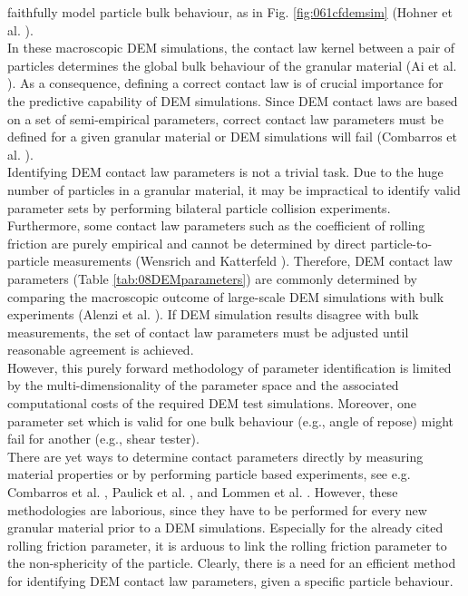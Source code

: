 faithfully model particle bulk behaviour, as in Fig. \ref{fig:061cfdemsim}
(Hohner et al. \cite{RefWorks:86}).\\
 
In these macroscopic \acs{DEM} simulations, the contact law kernel between a 
pair of particles determines the global bulk behaviour of the granular material (Ai et al. \cite{RefWorks:131}). 
As a consequence, defining a correct contact law is of crucial importance for the predictive 
capability of \acs{DEM} simulations. 
Since \acs{DEM} contact laws are based 
on a set of semi-empirical parameters, correct contact law 
parameters must be defined for a given granular material
or \acs{DEM} simulations will fail (Combarros et al. \cite{RefWorks:177}). \\
Identifying \acs{DEM} contact law parameters is not a trivial task. 
Due to the huge number of particles in a granular material, it
may be impractical to identify valid parameter sets by performing bilateral 
particle collision experiments. 
Furthermore, some contact law parameters such as the coefficient of rolling
friction are purely empirical and cannot be determined by direct 
particle-to-particle measurements (Wensrich and Katterfeld \cite{RefWorks:87}).
Therefore, \acs{DEM} contact law parameters (Table \ref{tab:08DEMparameters}) are
commonly determined by comparing the macroscopic outcome of large-scale \acs{DEM}
simulations with bulk experiments (Alenzi et al. \cite{RefWorks:91}). 
If \acs{DEM} simulation results disagree with bulk measurements, the set of contact
law parameters must be adjusted until reasonable agreement is achieved.\\
However, this purely forward methodology of parameter identification is limited by 
the multi-dimensionality of the parameter space and the associated computational costs of the required 
\acs{DEM} test simulations. 
Moreover, one parameter set which is valid for one bulk behaviour (e.g., angle
of repose) might fail for another (e.g., shear tester). \\
There are yet ways to determine contact parameters directly by measuring
material properties or by performing particle based experiments, see e.g. Combarros et al. \cite{RefWorks:177}, 
Paulick et al. \cite{RefWorks:181}, and Lommen et al. \cite{RefWorks:186}. 
However, these methodologies are laborious, 
since they have to be performed for every new granular material prior to a \acs{DEM}
simulations. 
Especially for the already cited rolling friction parameter, it is arduous to
link the rolling friction parameter to the non-sphericity of the particle. Clearly, there is a
need for an efficient method for identifying \acs{DEM} contact law parameters, given
a specific particle behaviour.



